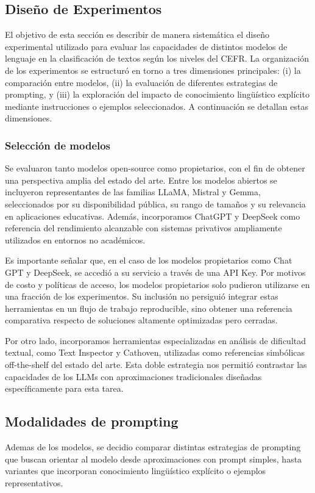 \subsection{Diseño de Experimentos}\label{subsection:clas_diseño}
El objetivo de esta sección es describir de manera sistemática el diseño experimental utilizado para evaluar las capacidades de distintos modelos de lenguaje en la clasificación de textos según los niveles del CEFR. La organización de los experimentos se estructuró en torno a tres dimensiones principales: (i) la comparación entre modelos, (ii) la evaluación de diferentes estrategias de prompting, y (iii) la exploración del impacto de conocimiento lingüístico explícito mediante instrucciones o ejemplos seleccionados. A continuación se detallan estas dimensiones.

\subsubsection{Selección de modelos}
Se evaluaron tanto modelos open-source como propietarios, con el fin de obtener una perspectiva amplia del estado del arte. Entre los modelos abiertos se incluyeron representantes de las familias LLaMA, Mistral y Gemma, seleccionados por su disponibilidad pública, su rango de tamaños y su relevancia en aplicaciones educativas. Además, incorporamos ChatGPT y DeepSeek como referencia del rendimiento alcanzable con sistemas privativos ampliamente utilizados en entornos no académicos.

Es importante señalar que, en el caso de los modelos propietarios como Chat GPT y DeepSeek, se accedió a su servicio a través de una API Key.
Por motivos de costo y políticas de acceso, los modelos propietarios solo pudieron utilizarse en una fracción de los experimentos. Su inclusión no persiguió integrar estas herramientas en un flujo de trabajo reproducible, sino obtener una referencia comparativa respecto de soluciones altamente optimizadas pero cerradas.

Por otro lado, incorporamos herramientas especializadas en análisis de dificultad textual, como Text Inspector y Cathoven, utilizadas como referencias simbólicas off-the-shelf del estado del arte. Esta doble estrategia nos permitió contrastar las capacidades de los LLMs con aproximaciones tradicionales diseñadas específicamente para esta tarea.

\subsection{Modalidades de prompting}\label{subsection:clas_prompt}
Ademas de los modelos, se decidio comparar distintas estrategias de prompting que buscan orientar al modelo desde aproximaciones con prompt simples, hasta variantes que incorporan conocimiento lingüístico explícito o ejemplos representativos.

